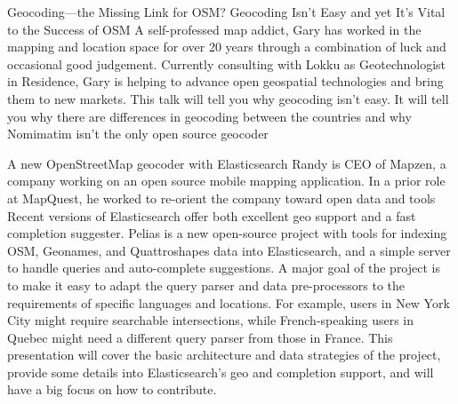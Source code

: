 %
{Geocoding---the Missing Link for OSM?}%
{Geocoding Isn't Easy and yet It's Vital to the Success of OSM}%
{A self-professed map addict, Gary has worked in the mapping and 
location space for over 20 years through a combination of luck and 
occasional good judgement. Currently consulting with Lokku as 
Geotechnologist in Residence, Gary is helping to advance open 
geospatial technologies and bring them to new markets. 
}%
{
This talk will tell you why 
geocoding isn't easy. 
It will tell you why there are differences in geocoding between the countries
and why Nomimatim isn't the only open source 
geocoder 
}

%
{A new OpenStreetMap geocoder with Elasticsearch}%
{Randy is CEO of Mapzen, a company working on an open source mobile mapping application. In a prior role at MapQuest, he worked to re-orient the company toward open data and tools}%
{%
Recent versions of Elasticsearch offer both 
excellent geo support and a fast completion suggester. Pelias is a 
new open-source project with tools for indexing 
OSM, Geonames, and Quattroshapes data into Elasticsearch, and a 
simple server to handle queries and auto-complete suggestions. 
A major goal of the project is to make it easy to adapt the query parser 
and data pre-processors to the requirements of specific languages and 
locations. For example, users in New York City might require searchable 
intersections, while French-speaking users in Quebec might need a 
different query parser from those in France. 
This 
presentation will cover the basic architecture and data strategies of the 
project, provide some details into Elasticsearch's geo and completion 
support, and will have a big focus on how to contribute. 
}

